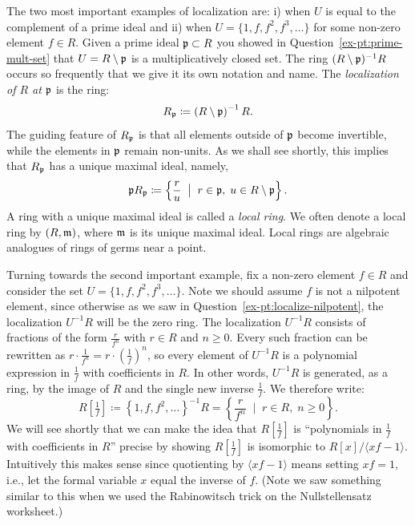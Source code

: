 \documentclass[12pt,reqno]{amsart}
\begin{document}
\hrulefill

The two most important examples of localization are: i) when $U$ is equal to the complement of a prime ideal and ii) when $U=\{1,f,f^2,f^3,\ldots\}$ for some non-zero element $f\in R$. Given a prime ideal $\mathfrak{p} \subset R$ you showed in Question~\ref{ex-pt:prime-mult-set} that $U=R \setminus \mathfrak{p}$ is a multiplicatively closed set. The ring $(R\setminus \mathfrak{p})^{-1}R$ occurs so frequently that we give it its own notation and name. The \emph{localization of $R$ at $\mathfrak{p}$} is the ring:
\[
R_{\mathfrak{p}} \coloneqq \left(R\setminus\mathfrak{p}\right)^{-1}R.
\]
The guiding feature of $R_{\mathfrak{p}}$ is that all elements outside of $\mathfrak{p}$ become invertible, while the elements in $\mathfrak{p}$ remain non-units. As we shall see shortly, this implies that $R_{\mathfrak{p}}$ has a unique maximal ideal, namely,
\[
\mathfrak{p} R_{\mathfrak{p}} \coloneqq \left\{ \frac{r}{u} \;\; \big|\;\; r \in \mathfrak{p},\; u\in R\setminus \mathfrak{p}\right\}.
\]
A ring with a unique maximal ideal is called a \emph{local ring}. We often denote a local ring by $(R,\mathfrak{m})$, where $\mathfrak{m}$ is its unique maximal ideal. Local rings are algebraic analogues of rings of germs near a point.

Turning towards the second important example, fix a non-zero element $f \in R$ and consider the set $U = \{1, f, f^2, f^3, \ldots\}$. Note we should assume $f$ is not a nilpotent element, since otherwise as we saw in Question~\ref{ex-pt:localize-nilpotent}, the localization $U^{-1}R$ will be the zero ring. The localization $U^{-1}R$ consists of fractions of the form $\frac{r}{f^n}$ with $r \in R$ and $n \geq 0$. Every such fraction can be rewritten as $r \cdot \frac{1}{f^n} = r \cdot \left(\frac{1}{f}\right)^n$, so every element of $U^{-1}R$ is a polynomial expression in $\frac{1}{f}$ with coefficients in $R$. In other words, $U^{-1}R$ is generated, as a ring, by the image of $R$ and the single new inverse $\frac{1}{f}$. We therefore write:
\[
R\left[\tfrac{1}{f}\right] \coloneqq \left\{1, f, f^2, \ldots\right\}^{-1}R = \left\{ \frac{r}{f^n} \;\;\big|\;\; r \in R,\; n \geq 0 \right\}.
\]
We will see shortly that we can make the idea that $R[\frac{1}{f}]$ is  ``polynomials in $\frac{1}{f}$ with coefficients in $R$'' precise by showing $R[\frac{1}{f}]$ is isomorphic to $R[x]/\langle xf-1\rangle$. Intuitively this makes sense since quotienting by $\langle xf-1\rangle$ means setting $xf=1$, i.e., let the formal variable $x$ equal the inverse of $f$. (Note we saw something similar to this when we used the Rabinowitsch trick on the Nullstellensatz worksheet.)


\hrulefill
\end{document}
